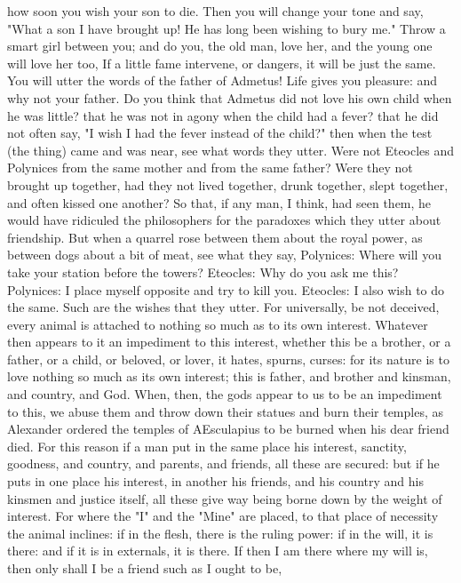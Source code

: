 \documentclass[a4paper]{article}
\begin{document}
how soon you wish your son to die. Then you will change your tone and say,
"What a son I have brought up! He has long been wishing to bury me." Throw a
smart girl between you; and do you, the old man, love her, and the young one
will love her too, If a little fame intervene, or dangers, it will be just the
same. You will utter the words of the father of Admetus!
       Life gives you pleasure: and why not your father.
    Do you think that Admetus did not love his own child when he was little?
that he was not in agony when the child had a fever? that he did not often say,
"I wish I had the fever instead of the child?" then when the test (the thing)
came and was near, see what words they utter. Were not Eteocles and Polynices
from the same mother and from the same father? Were they not brought up
together, had they not lived together, drunk together, slept together, and
often kissed one another? So that, if any man, I think, had seen them, he would
have ridiculed the philosophers for the paradoxes which they utter about
friendship. But when a quarrel rose between them about the royal power, as
between dogs about a bit of meat, see what they say,
       Polynices: Where will you take your station before the towers?
       Eteocles: Why do you ask me this?
       Polynices: I place myself opposite and try to kill you.
       Eteocles: I also wish to do the same.
Such are the wishes that they utter.
    For universally, be not deceived, every animal is attached to nothing so
much as to its own interest. Whatever then appears to it an impediment to this
interest, whether this be a brother, or a father, or a child, or beloved, or
lover, it hates, spurns, curses: for its nature is to love nothing so much as
its own interest; this is father, and brother and kinsman, and country, and
God. When, then, the gods appear to us to be an impediment to this, we abuse
them and throw down their statues and burn their temples, as Alexander ordered
the temples of AEsculapius to be burned when his dear friend died.
    For this reason if a man put in the same place his interest, sanctity,
goodness, and country, and parents, and friends, all these are secured: but if
he puts in one place his interest, in another his friends, and his country and
his kinsmen and justice itself, all these give way being borne down by the
weight of interest. For where the "I" and the "Mine" are placed, to that place
of necessity the animal inclines: if in the flesh, there is the ruling power:
if in the will, it is there: and if it is in externals, it is there. If then I
am there where my will is, then only shall I be a friend such as I ought to be,
\end{document}
